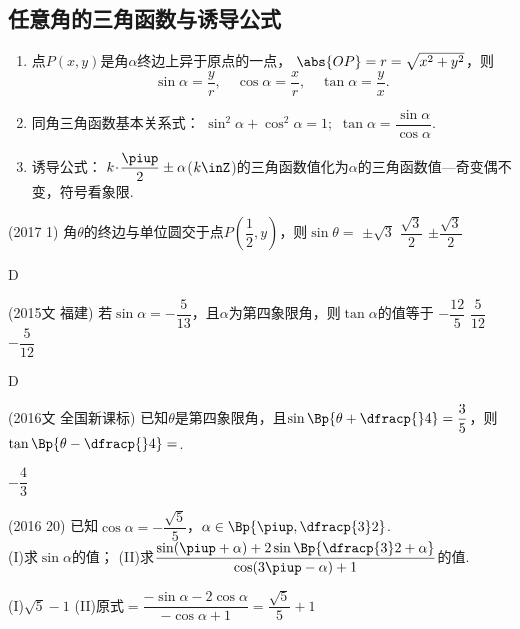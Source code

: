  \subsection{任意角的三角函数与诱导公式}
    \begin{enumerate}[label=\arabic*)]
      \item 点$ P(x,y) $是角$ \alpha $终边上异于原点的一点，
        $ \abs{OP} =r=\sqrt{x^2+y^2}$，则\[\sin\alpha=\dfrac{y}{r},\quad \cos\alpha=\dfrac{x}{r},\quad \tan\alpha=\dfrac{y}{x}.\]
      \item 同角三角函数基本关系式：
         $\sin^2\alpha+\cos^2\alpha=1;$\qquad
         $ \tan\alpha=\dfrac{\sin\alpha}{\cos\alpha}.$
      \item 诱导公式：
        $ k\!\cdot\!\dfrac{\piup}{2}\pm\alpha $($k\inZ$)的三角函数值化为$\alpha$的三角函数值---{\kaishu 奇变偶不变，符号看象限}.
    \end{enumerate}
    \begin{exercise}
      \item%
        (2017  1)
        角$\theta$的终边与单位圆交于点$P(\dfrac12,y)$，则$\sin\theta=$\xz
         {$\pm\sqrt3$}
         {$\dfrac{\sqrt3}2$}
         {$\pm\dfrac{\sqrt3}2$}
        \begin{answer}
          D
        \end{answer}
      \item%
        {\kaishu (2015文 \textbullet 福建)}
        若$\sin\alpha=-\dfrac5{13}$，且$\alpha$为第四象限角，则$\tan\alpha$的值等于\xz
         {$-\dfrac{12}5$}
         {$\dfrac5{12}$}
         {$-\dfrac5{12}$}
        \begin{answer}
          D
        \end{answer}
      \item%
        {\kaishu (2016文 \textbullet 全国新课标)}
        已知$\theta$是第四象限角，且$\sin\Bp{\theta+\dfracp{}4}=\dfrac35$，则$\tan\Bp{\theta-\dfracp{}4}=$\tk.
        \begin{answer}
          $-\dfrac43$
        \end{answer}
      \item%
        (2016  20)
        已知$\cos\alpha=-\dfrac{\sqrt5}5$，$\alpha\in\Bp{\piup,\dfracp{3}2}$.\\
        (I)求$\sin\alpha$的值；
        (II)求$\dfrac{\sin(\piup+\alpha)+2\sin\Bp{\dfracp{3}2+\alpha}}{\cos(3\piup-\alpha)+1}$的值.
        \begin{answer}
          (I)$\sqrt5-1$
          (II)原式$=\dfrac{-\sin\alpha-2\cos\alpha}{-\cos\alpha+1}=\dfrac{\sqrt5}5+1$
        \end{answer}
      \vspace{4cm}
    \end{exercise}
